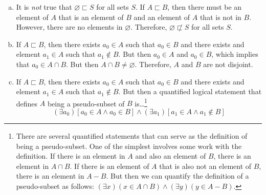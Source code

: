 \documentclass[11pt,letterpaper]{article}
\begin{document}
\sol 
\begin{enumerate}[(a)]
\item It is \textit{not} true that $\varnothing \sqsubset S$ for all sets $S$. If $A \sqsubset B$, then there must be an element of $A$ that is an element of $B$ and an element of $A$ that is not in $B$. However, there are no elements in $\varnothing$. Therefore, $\varnothing \not\sqsubset S$ for all sets $S$. \pspace

\item If $A \sqsubset B$, then there exists $a_0 \in A$ such that $a_0 \in B$ and there exists and element $a_1 \in A$ such that $a_1 \notin B$. But then $a_0 \in A$ and $a_0 \in B$, which implies that $a_0 \in A \cap B$. But then $A \cap B \neq \varnothing$. Therefore, $A$ and $B$ are not disjoint. \pspace

\item If $A \sqsubset B$, then there exists $a_0 \in A$ such that $a_0 \in B$ and there exists and element $a_1 \in A$ such that $a_1 \notin B$. But then a quantified logical statement that defines $A$ being a pseudo-subset of $B$ is\dots\footnote{There are several quantified statements that can serve as the definition of being a pseudo-subset. One of the simplest involves some work with the definition. If there is an element in $A$ and also an element of $B$, there is an element in $A \cap B$. If there is an element of $A$ that is also not an element of $B$, there is an element in $A - B$. But then we can quantify the definition of a pseudo-subset as follows: $(\exists x)(x \in A \cap B) \wedge (\exists y)(y \in A - B)$.}
	\[
	(\exists a_0) [a_0 \in A \wedge a_0 \in B] \wedge (\exists a_1) [a_1 \in A \wedge a_1 \notin B]
	\]


\end{enumerate}
\end{document}
